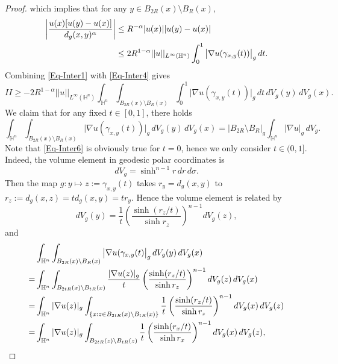 \documentclass[11pt,reqno]{amsart}
\theoremstyle{definition}
\theoremstyle{remark}
\numberwithin{equation}{section}
\renewcommand{\(}{\left(}
\renewcommand{\)}{\right)}
\renewcommand{\-}{\overline}
\begin{document}
\begin{proof}
which implies that for any $y\in B_{2R}(x)\setminus B_R(x)$,
\begin{align}
	\bigg|\frac{u(x)[u(y)-u(x)]}{d_g(x,y)^{\alpha}}\bigg|&\leq R^{-\alpha}|u(x)||u(y)-u(x)|\notag\\
	&\leq 2R^{1-\alpha}||u||_{L^{\infty}(\mathbb{H}^n)}\int_{0}^1{\big|\nabla u(\gamma_{x,y}(t))\big|_g}\,dt\label{Eq-Inter4}.
\end{align}
Combining \eqref{Eq-Inter1} with \eqref{Eq-Inter4} gives
\begin{equation}\label{Eq-Inter5}
	II\geq -2R^{1-\alpha}||u||_{L^{\infty}(\mathbb{H}^n)}\int_{\mathbb{H}^n}\int_{B_{2R}(x)\setminus B_R(x)}\int_{0}^1{\big|\nabla u(\gamma_{x,y}(t))\big|_g}\,dt\,dV_g(y)\,dV_g(x).
\end{equation}
We claim that for any fixed $t\in[0,1]$, there holds
\begin{equation}\label{Eq-Inter6}
\int_{\mathbb{H}^n}\int_{B_{2R}(x)\setminus B_R(x)}\big|\nabla u(\gamma_{x,y}(t))\big|_g\,dV_g(y)\,dV_g(x)=|B_{2R}\setminus B_R|_g\int_{\mathbb{H}^n}|\nabla u|_g\,dV_g.
\end{equation}
Note that \eqref{Eq-Inter6} is obviously true for $t=0$, hence we only consider $t\in(0,1]$. Indeed, the volume element in geodesic polar coordinates is 
\begin{equation}\label{Eq-Inter7}
	dV_g=\sinh^{n-1}r\,dr\,d\sigma.
\end{equation}
Then the map $g: y\mapsto z:=\gamma_{x,y}(t)$ takes $r_y=d_g(x,y)$ to $r_z:=d_g(x,z)=td_g(x,y)=tr_y$. Hence the volume element is related by
\begin{equation}\label{Eq-Inter8}
	dV_g(y)=\frac{1}{t}\left(\frac{\sinh(r_z/t)}{\sinh r_z}\right)^{n-1}dV_g(z),
\end{equation}
and 
\begin{align}
	&\int_{\mathbb{H}^n}\int_{B_{2R}(x)\setminus B_R(x)}\big|\nabla u(\gamma_{x,y}(t)\big|_g\,dV_g(y)\,dV_g(x)\notag\\
	=&\int_{\mathbb{H}^n}\int_{B_{2tR}(x)\setminus B_{tR}(x)}\frac{|\nabla u(z)|_g}{t}\left(\frac{\sinh(r_z/t)}{\sinh r_z}\right)^{n-1}dV_g(z)\,dV_g(x)\notag\\
	=&\int_{\mathbb{H}^n}|\nabla u(z)|_g\int_{\{x:z\in B_{2tR}(x)\setminus B_{tR}(x)\}}\frac{1}{t}\left(\frac{\sinh(r_z/t)}{\sinh r_z}\right)^{n-1}dV_g(x)\,dV_g(z)\notag\\
	=&\int_{\mathbb{H}^n}|\nabla u(z)|_g\int_{B_{2tR}(z)\setminus B_{tR}(z)}\frac{1}{t}\left(\frac{\sinh(r_x/t)}{\sinh r_x}\right)^{n-1}dV_g(x)\,dV_g(z),\label{Eq-Inter9}
\end{align}

\end{proof}
\end{document}
